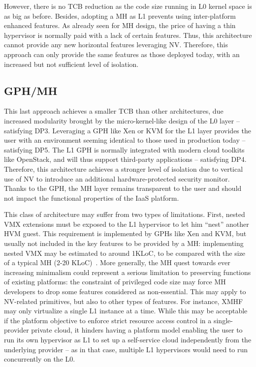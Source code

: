 \documentclass{sig-alternate}
\begin{document}
However, there is no TCB reduction as the code size running in L0 kernel space is as big as before. 
Besides, adopting a MH as L1 prevents using inter-platform enhanced features. As already seen for MH design, the price of having a thin hypervisor is normally paid with a lack of certain features. 
Thus, this architecture cannot provide any new horizontal features leveraging NV. Therefore, this approach can only provide the same features as those deployed today, with an increased but not sufficient level of isolation.

\subsection{GPH/MH}
\label{par:gom}

\noindent This last approach achieves a smaller TCB than other architectures, due increased modularity brought by the micro-kernel-like design of the L0 layer -- satisfying DP3. Leveraging a GPH like Xen or KVM for the L1 layer provides the user with an environment seeming identical to those used in production today -- satisfying DP5. The L1 GPH is normally integrated with modern cloud toolkits like OpenStack, and will thus support third-party applications -- satisfying DP4.
Therefore, this architecture achieves a stronger level of isolation due to vertical use of NV to introduce an additional hardware-protected security monitor. Thanks to the GPH, the MH layer remains transparent to the user and should not impact the functional properties of the IaaS platform.

This class of architecture may suffer from two types of limitations. First, nested VMX extensions must be exposed to the L1 hypervisor to let him ``nest'' another HVM guest. This requirement is implemented by GPHs like Xen and KVM, but usually not included in the key features to be provided by a MH: implementing nested VMX may be estimated to around 1KLoC, to be compared with the size of a typical MH (2-20 KLoC)~\cite{xmhf}.
More generally, the MH quest towards ever increasing minimalism could represent a serious limitation to preserving functions of existing platforms: the constraint of privileged code size may force MH developers to drop some features considered as non-essential. This may apply to NV-related primitives, but also to other types of features. For instance, XMHF may only virtualize a single L1 instance at a time. While this may be acceptable if the platform objective to enforce strict resource access control in a single-provider private cloud, it hinders having a platform model enabling the user to run its own hypervisor as L1 to set up a self-service cloud independently from the underlying provider -- as in that case, multiple L1 hypervisors would need to run concurrently on the L0.
\end{document}
